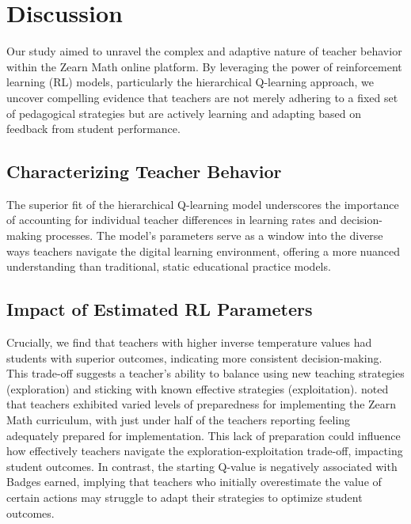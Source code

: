 \documentclass[
  number,
  preprint,
  3p,
  onecolumn]{elsarticle}
\begin{document}
\section{Discussion}\label{discussion}

Our study aimed to unravel the complex and adaptive nature of teacher
behavior within the Zearn Math online platform. By leveraging the power
of reinforcement learning (RL) models, particularly the hierarchical
Q-learning approach, we uncover compelling evidence that teachers are
not merely adhering to a fixed set of pedagogical strategies but are
actively learning and adapting based on feedback from student
performance.

\subsection{Characterizing Teacher
Behavior}\label{characterizing-teacher-behavior}

The superior fit of the hierarchical Q-learning model underscores the
importance of accounting for individual teacher differences in learning
rates and decision-making processes. The model's parameters serve as a
window into the diverse ways teachers navigate the digital learning
environment, offering a more nuanced understanding than traditional,
static educational practice models.

\subsection{Impact of Estimated RL
Parameters}\label{impact-of-estimated-rl-parameters}

Crucially, we find that teachers with higher inverse temperature values
had students with superior outcomes, indicating more consistent
decision-making. This trade-off suggests a teacher's ability to balance
using new teaching strategies (exploration) and sticking with known
effective strategies (exploitation). \citep{morrison2019} noted that
teachers exhibited varied levels of preparedness for implementing the
Zearn Math curriculum, with just under half of the teachers reporting
feeling adequately prepared for implementation. This lack of preparation
could influence how effectively teachers navigate the
exploration-exploitation trade-off, impacting student outcomes. In
contrast, the starting Q-value is negatively associated with Badges
earned, implying that teachers who initially overestimate the value of
certain actions may struggle to adapt their strategies to optimize
student outcomes.
\end{document}
